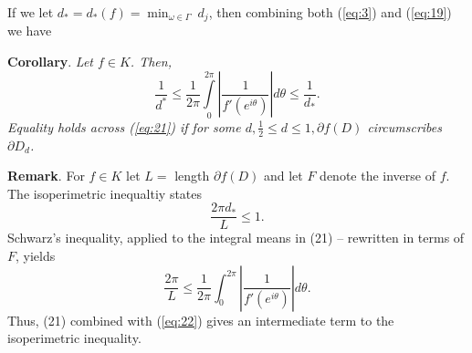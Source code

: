 If we let $d_\ast=d_\ast(f)=\displaystyle{\min_{\omega \in \Gamma}}\ 
d_j$,  then combining both (\ref{eq:3}) and (\ref{eq:19}) we have 
\vspace{12pt}

{\bf Corollary}. {\em  Let $f\in K$.  Then, 
\begin{equation}
\label{eq:21}
\frac{1}{d^\ast} \leq \frac{1}{2\pi} \int\limits^{2\pi}_0 \left|
\frac{1}{f' (e^{i\theta})} \right| d\theta \leq \frac{1}{d_\ast}.
\end{equation}
Equality holds across {\rm (\ref{eq:21})} if for some $d, \frac{1}{2} \leq
d\leq 1, \partial f(D)$ circumscribes $\partial D_d$.}
\vspace{12pt}

{\bf Remark}.  For $f\in K$ let $L=$ length $\partial f(D)$ and let $F$ denote
the inverse of $f$.  The isoperimetric inequaltiy states
$$\frac{2\pi d_\ast}{L} \leq 1.$$
Schwarz's inequality, applied to the integral means in (21) --
rewritten in terms of $F$, yields
\begin{equation}
\label{eq:22}
\frac{2\pi}{L}\leq \frac{1}{2\pi} \int^{2\pi}_0
\left|\frac{1}{f'(e^{i\theta})} \right|d\theta.
\end{equation}
Thus, (21) combined with (\ref{eq:22}) gives an intermediate term to
the isoperimetric inequality.


